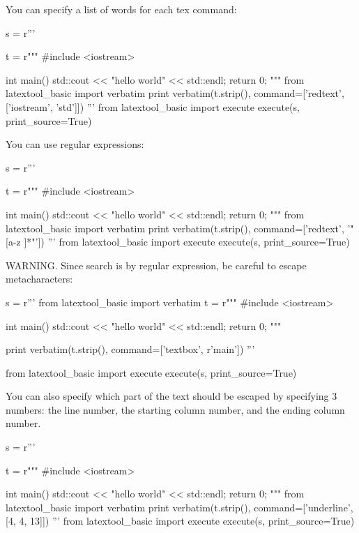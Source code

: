 \newpage
You can specify a list of words for each tex command:
\begin{python}
s = r'''

t = r"""
#include <iostream>

int main()
{
    std::cout << "hello world" << std::endl;
    return 0;
}
"""
from latextool_basic import verbatim
print verbatim(t.strip(), command=['redtext', ['iostream', 'std']])
'''
from latextool_basic import execute
execute(s, print_source=True)
\end{python}



\newpage


You can use regular expressions:
\begin{python}
s = r'''

t = r"""
#include <iostream>

int main()
{
    std::cout << "hello world" << std::endl;
    return 0;
}"""
from latextool_basic import verbatim
print verbatim(t.strip(), command=['redtext', '"[a-z ]*"'])
'''
from latextool_basic import execute
execute(s, print_source=True)
\end{python}


\newpage

WARNING.
Since search is by regular expression, 
be careful to escape metacharacters:
\begin{python}
s = r'''
from latextool_basic import verbatim
t = r"""
#include <iostream>

int main()
{
    std::cout << "hello world" << std::endl;
    return 0;
}
"""

print verbatim(t.strip(), command=['textbox', r'main\(\)'])
'''

from latextool_basic import execute
execute(s, print_source=True)
\end{python}


\newpage

You can also specify which part of the text should be escaped
by specifying 3
numbers: the line number, the starting column number, and the ending
column number.
\begin{python}
s = r'''

t = r"""
#include <iostream>

int main()
{
    std::cout << "hello world" << std::endl;
    return 0;
}
"""
from latextool_basic import verbatim
print verbatim(t.strip(), command=['underline', [4, 4, 13]])
'''
from latextool_basic import execute
execute(s, print_source=True)
\end{python}




